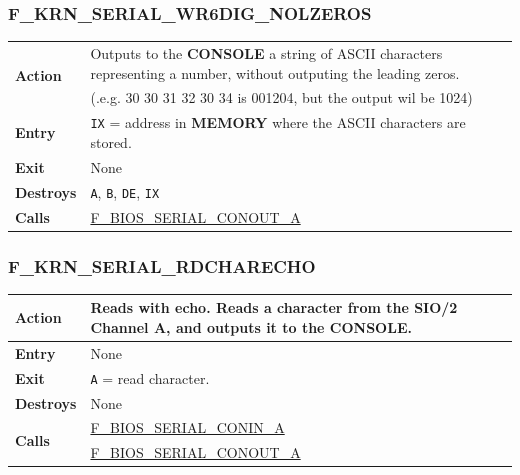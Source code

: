 \documentclass[a4paper,11pt]{article}
\begin{document}
        \subsubsection{F\_KRN\_SERIAL\_WR6DIG\_NOLZEROS}
        \label{func:fkrnserialwr6dignolzeros}
        \begin{tabular}{l p{9cm}}
            \hline\multirow[t]{2}{4em}{\textbf{Action}}
            & Outputs to the \textbf{CONSOLE} a string of ASCII characters 
            representing a number, without outputing the leading zeros.\\
            & (.e.g. 30 30 31 32 30 34 is 001204, but the output wil be 1024)\\
            \hline\textbf{Entry} 
            & \texttt{IX} = address in \textbf{MEMORY} where the ASCII 
            characters are stored.\\
            \hline\textbf{Exit} & None \\
            \hline\textbf{Destroys} & \texttt{A}, \texttt{B}, \texttt{DE}, \texttt{IX} \\
            \hline\textbf{Calls}
            & \hyperref[func:fbiosserialconouta]{F\_BIOS\_SERIAL\_CONOUT\_A}\\
            \hline
        \end{tabular}

        \subsubsection{F\_KRN\_SERIAL\_RDCHARECHO}
        \label{func:fkrnserialrdcharecho}
        \begin{tabular}{l p{9cm}}
            \hline\textbf{Action}
            & Reads with echo. Reads a character from the \textbf{SIO/2} Channel
            A, and outputs it to the \textbf{CONSOLE}.\\
            \hline\textbf{Entry} & None \\
            \hline\textbf{Exit} & \texttt{A} = read character. \\
            \hline\textbf{Destroys} & None \\
            \hline\multirow[t]{2}{4em}{\textbf{Calls}}
            & \hyperref[func:fbiosserialconina]{F\_BIOS\_SERIAL\_CONIN\_A}\\
            & \hyperref[func:fbiosserialconouta]{F\_BIOS\_SERIAL\_CONOUT\_A}\\
            \hline
        \end{tabular}
\end{document}
